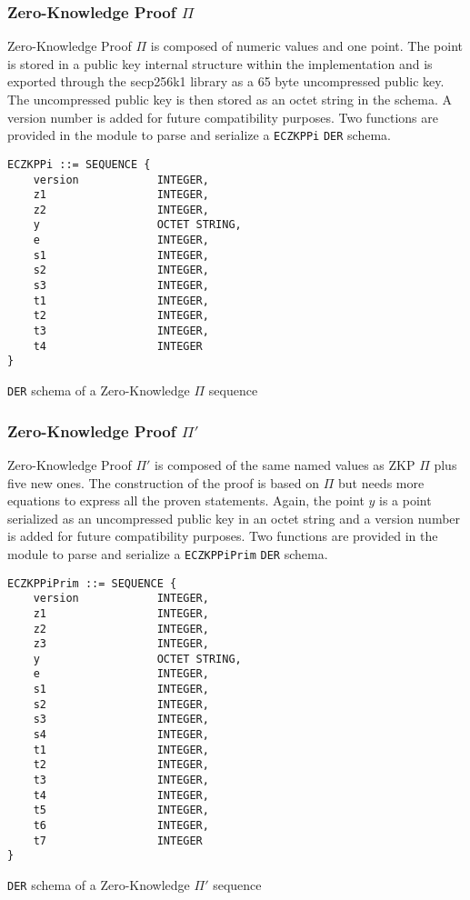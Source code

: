 \subsubsection{Zero-Knowledge Proof $\Pi$}

Zero-Knowledge Proof $\Pi$ is composed of numeric values and one point. The
point is stored in a public key internal structure within the implementation and
is exported through the secp256k1 library as a 65 byte uncompressed public key.
The uncompressed public key is then stored as an octet string in the schema. A
version number is added for future compatibility purposes. Two functions are
provided in the module to parse and serialize a \texttt{ECZKPPi} \texttt{DER}
schema.

\begin{listing}
  \begin{verbatim}
ECZKPPi ::= SEQUENCE {
    version            INTEGER,
    z1                 INTEGER,
    z2                 INTEGER,
    y                  OCTET STRING,
    e                  INTEGER,
    s1                 INTEGER,
    s2                 INTEGER,
    s3                 INTEGER,
    t1                 INTEGER,
    t2                 INTEGER,
    t3                 INTEGER,
    t4                 INTEGER
}
  \end{verbatim}
	\caption{\texttt{DER} schema of a Zero-Knowledge $\Pi$ sequence}
	\label{lst:DERSchemaZKPPi}
\end{listing}

\subsubsection{Zero-Knowledge Proof $\Pi'$}

Zero-Knowledge Proof $\Pi'$ is composed of the same named values as ZKP $\Pi$
plus five new ones. The construction of the proof is based on $\Pi$ but needs
more equations to express all the proven statements. Again, the point $y$ is a
point serialized as an uncompressed public key in an octet string and a version
number is added for future compatibility purposes. Two functions are provided in
the module to parse and serialize a \texttt{ECZKPPiPrim} \texttt{DER} schema.

\begin{listing}
  \begin{verbatim}
ECZKPPiPrim ::= SEQUENCE {
    version            INTEGER,
    z1                 INTEGER,
    z2                 INTEGER,
    z3                 INTEGER,
    y                  OCTET STRING,
    e                  INTEGER,
    s1                 INTEGER,
    s2                 INTEGER,
    s3                 INTEGER,
    s4                 INTEGER,
    t1                 INTEGER,
    t2                 INTEGER,
    t3                 INTEGER,
    t4                 INTEGER,
    t5                 INTEGER,
    t6                 INTEGER,
    t7                 INTEGER
}
  \end{verbatim}
	\caption{\texttt{DER} schema of a Zero-Knowledge $\Pi'$ sequence}
	\label{lst:DERSchemaZKPPi2}
\end{listing}

